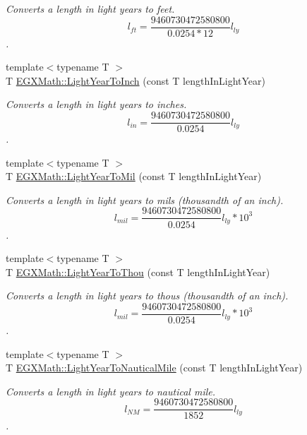 \begin{DoxyCompactItemize}
\begin{DoxyCompactList}\small\item\em Converts a length in light years to feet. \[ l_{ft}= \frac{9460730472580800}{0.0254 * 12} l_{ly} \]. \end{DoxyCompactList}\item 
{\footnotesize template$<$typename T $>$ }\\T \mbox{\hyperlink{group___e_g_x_math-_conversions-_length_conversions-_astronomical-_light_year-_imperial_gafb89ce302210990623906b463d6e50cb}{E\+G\+X\+Math\+::\+Light\+Year\+To\+Inch}} (const T length\+In\+Light\+Year)
\begin{DoxyCompactList}\small\item\em Converts a length in light years to inches. \[ l_{in}= \frac{9460730472580800}{0.0254} l_{ly} \]. \end{DoxyCompactList}\item 
{\footnotesize template$<$typename T $>$ }\\T \mbox{\hyperlink{group___e_g_x_math-_conversions-_length_conversions-_astronomical-_light_year-_imperial_ga980a3d37f73ebc5f217366ee01e7b4ae}{E\+G\+X\+Math\+::\+Light\+Year\+To\+Mil}} (const T length\+In\+Light\+Year)
\begin{DoxyCompactList}\small\item\em Converts a length in light years to mils (thousandth of an inch). \[ l_{mil}= \frac{9460730472580800}{0.0254} l_{ly} * 10^{3} \]. \end{DoxyCompactList}\item 
{\footnotesize template$<$typename T $>$ }\\T \mbox{\hyperlink{group___e_g_x_math-_conversions-_length_conversions-_astronomical-_light_year-_imperial_ga84d83b078dfeb11c1cdaca84b4f988cb}{E\+G\+X\+Math\+::\+Light\+Year\+To\+Thou}} (const T length\+In\+Light\+Year)
\begin{DoxyCompactList}\small\item\em Converts a length in light years to thous (thousandth of an inch). \[ l_{mil}= \frac{9460730472580800}{0.0254} l_{ly} * 10^{3} \]. \end{DoxyCompactList}\item 
{\footnotesize template$<$typename T $>$ }\\T \mbox{\hyperlink{group___e_g_x_math-_conversions-_length_conversions-_astronomical-_light_year-_nautical_ga0195b6c7d9efe06bed6d571046d485b4}{E\+G\+X\+Math\+::\+Light\+Year\+To\+Nautical\+Mile}} (const T length\+In\+Light\+Year)
\begin{DoxyCompactList}\small\item\em Converts a length in light years to nautical mile. \[ l_{NM}= \frac{9460730472580800}{1852} l_{ly} \]. \end{DoxyCompactList}\item 

\end{DoxyCompactItemize}

